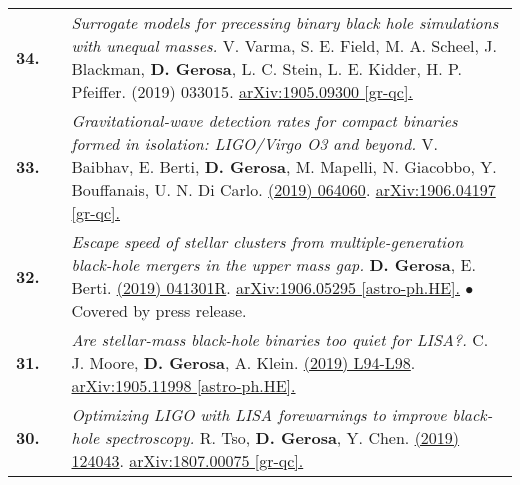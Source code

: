 {\begin{longtable}{rp{0.3cm}p{15.8cm}}
%
\textbf{34.} & & \textit{Surrogate models for precessing binary black hole simulations with unequal masses.}
\newline{}
V. Varma, S. E. Field, M. A. Scheel, J. Blackman, \textbf{D. Gerosa}, L. C. Stein, L. E. Kidder, H. P. Pfeiffer.
\newline{}
{\prr 1 (2019) 033015}. \href{https://arxiv.org/abs/1905.09300}{arXiv:1905.09300 [gr-qc].}
\vspace{0.09cm}\\
%
\textbf{33.} & & \textit{Gravitational-wave detection rates for compact binaries formed in isolation: LIGO/Virgo O3 and beyond.}
\newline{}
V. Baibhav, E. Berti, \textbf{D. Gerosa}, M. Mapelli, N. Giacobbo, Y. Bouffanais, U. N. Di Carlo.
\newline{}
\href{https://journals.aps.org/prd/abstract/10.1103/PhysRevD.100.064060}{\prd 100 (2019) 064060}. \href{https://arxiv.org/abs/1906.04197}{arXiv:1906.04197 [gr-qc].}
\vspace{0.09cm}\\
%
\textbf{32.} & & \textit{Escape speed of stellar clusters from multiple-generation black-hole mergers in the upper mass gap.}
\newline{}
\textbf{D. Gerosa}, E. Berti.
\newline{}
\href{https://journals.aps.org/prd/abstract/10.1103/PhysRevD.100.041301}{\prdrc 100 (2019) 041301R}. \href{https://arxiv.org/abs/1906.05295}{arXiv:1906.05295 [astro-ph.HE].}
\newline{}
\textcolor{color1}{$\bullet$} Covered by press release.
\vspace{0.09cm}\\
%
\textbf{31.} & & \textit{Are stellar-mass black-hole binaries too quiet for LISA?.}
\newline{}
C. J. Moore, \textbf{D. Gerosa}, A. Klein.
\newline{}
\href{https://doi.org/10.1093/mnrasl/slz104}{\mnrasl 488 (2019) L94-L98}. \href{https://arxiv.org/abs/1905.11998}{arXiv:1905.11998 [astro-ph.HE].}
\vspace{0.09cm}\\
%
\textbf{30.} & & \textit{Optimizing LIGO with LISA forewarnings to improve black-hole spectroscopy.}
\newline{}
R. Tso, \textbf{D. Gerosa}, Y. Chen.
\newline{}
\href{https://journals.aps.org/prd/abstract/10.1103/PhysRevD.99.124043}{\prd 99 (2019) 124043}. \href{https://arxiv.org/abs/1807.00075}{arXiv:1807.00075 [gr-qc].}

\end{longtable}}
